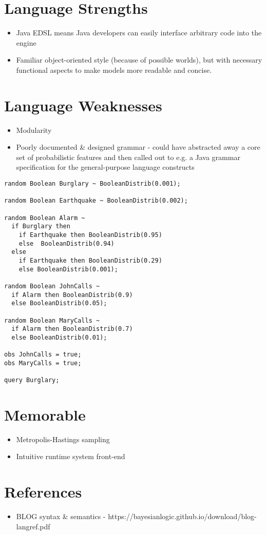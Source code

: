\documentclass{handout}
\begin{document}
\section{Language Strengths}
\begin{itemize}
\item Java EDSL means Java developers can easily interface arbitrary code into the engine
\item Familiar object-oriented style (because of possible worlds), but with necessary functional
      aspects to make models more readable and concise.
\end{itemize}

\section{Language Weaknesses}
\begin{itemize}
\item Modularity
\item Poorly documented \& designed grammar - could have abstracted away a core set of
      probabilistic features and then called out to e.g. a Java grammar specification
      for the general-purpose language constructs
\end{itemize}
\begin{verbatim}
random Boolean Burglary ~ BooleanDistrib(0.001);

random Boolean Earthquake ~ BooleanDistrib(0.002);

random Boolean Alarm ~
  if Burglary then
    if Earthquake then BooleanDistrib(0.95)
    else  BooleanDistrib(0.94)
  else
    if Earthquake then BooleanDistrib(0.29)
    else BooleanDistrib(0.001);

random Boolean JohnCalls ~
  if Alarm then BooleanDistrib(0.9)
  else BooleanDistrib(0.05);

random Boolean MaryCalls ~
  if Alarm then BooleanDistrib(0.7)
  else BooleanDistrib(0.01);

obs JohnCalls = true;
obs MaryCalls = true;

query Burglary;
\end{verbatim}

\section{Memorable}
\begin{itemize}
\item Metropolis-Hastings sampling
\item Intuitive runtime system front-end
\end{itemize}

\section{References}
\begin{itemize}
\item BLOG syntax \& semantics - https://bayesianlogic.github.io/download/blog-langref.pdf
\end{itemize}
\end{document}
